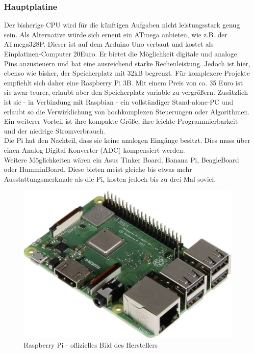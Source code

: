 \documentclass[twoside,12pt,a4paper]{report}
\begin{document}
	
	
	
	\subsubsection{Hauptplatine}
	Der bisherige CPU wird für die künftigen Aufgaben nicht leistungsstark genug sein. Als Alternative würde sich erneut ein ATmega anbieten, wie z.B. der ATmega328P. Dieser ist auf dem Arduino Uno verbaut und kostet als Einplatinen-Computer 20Euro. Er bietet die Möglichkeit digitale und analoge Pins anzusteuern und hat eine ausreichend starke Rechenleistung. Jedoch ist hier, ebenso wie bisher, der Speicherplatz mit 32kB begrenzt. Für komplexere Projekte empfiehlt sich daher eine Raspberry Pi 3B. Mit einem Preis von ca. 35 Euro ist sie zwar teurer, erlaubt aber den Speicherplatz variable zu vergrößern. Zusätzlich ist sie - in Verbindung mit Raspbian - ein vollständiger Stand-alone-PC und erlaubt so die Verwirklichung von hochkomplexen Steuerungen oder Algorithmen. Ein weiterer Vorteil ist ihre kompakte Größe, ihre leichte Programmierbarkeit und der niedrige Stromverbrauch. \\
	Die Pi hat den Nachteil, dass sie keine analogen Eingänge besitzt. Dies muss über einen  Analog-Digital-Konverter (ADC) kompensiert werden. \\
	Weitere Möglichkeiten wären ein Asus Tinker Board, Banana Pi, BeagleBoard oder HumminBoard. Diese bieten meist gleiche bis etwas mehr Ausstattungsmerkmale als die Pi, kosten jedoch bis zu drei Mal soviel. 
	
	\begin{figure}[!htb]
		\centering
		\includegraphics[scale=0.25]{images/Pi.jpg}
		\caption{Raspberry Pi - offizielles Bild des Herstellers}
	\end{figure}
	
\end{document}
